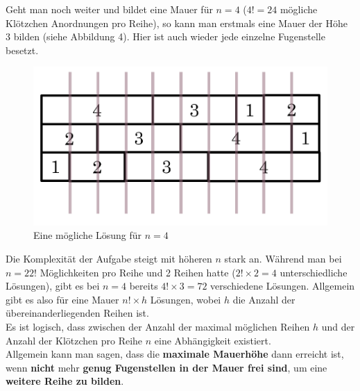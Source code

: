 \documentclass[a4paper,12pt]{article}
\begin{document}
Geht man noch weiter und bildet eine Mauer für $n = 4$ ($4! = 24$ mögliche Klötzchen Anordnungen pro Reihe), so kann man erstmals eine Mauer der Höhe 3 bilden (siehe Abbildung 4). Hier ist auch wieder jede einzelne Fugenstelle besetzt.
\begin{figure}[H]
    \centering
    \includegraphics[width=0.7\linewidth]{Bilder/Aufgabe1/Loesung_N4.png}
    \caption{Eine mögliche Lösung für $n = 4$}
\end{figure}

Die Komplexität der Aufgabe steigt mit höheren $n$ stark an. Während man bei $n = 2 2!$ Möglichkeiten pro Reihe und 2 Reihen hatte ($2!\times2 = 4$ unterschiedliche Lösungen), gibt es bei $n = 4$ bereits $4!\times3 = 72$ verschiedene Lösungen.
Allgemein gibt es also für eine Mauer $n!\times h$ Lösungen, wobei $h$ die Anzahl der übereinanderliegenden Reihen ist.
\\[0.4cm]
Es ist logisch, dass zwischen der Anzahl der maximal möglichen Reihen $h$ und der Anzahl der Klötzchen pro Reihe $n$ eine Abhängigkeit existiert.
\\[0.4cm]
Allgemein kann man sagen, dass die \textbf{maximale Mauerhöhe} dann erreicht ist, wenn \textbf{nicht} mehr \textbf{genug Fugenstellen in der Mauer frei sind}, um eine \textbf{weitere Reihe zu bilden}.
\end{document}
